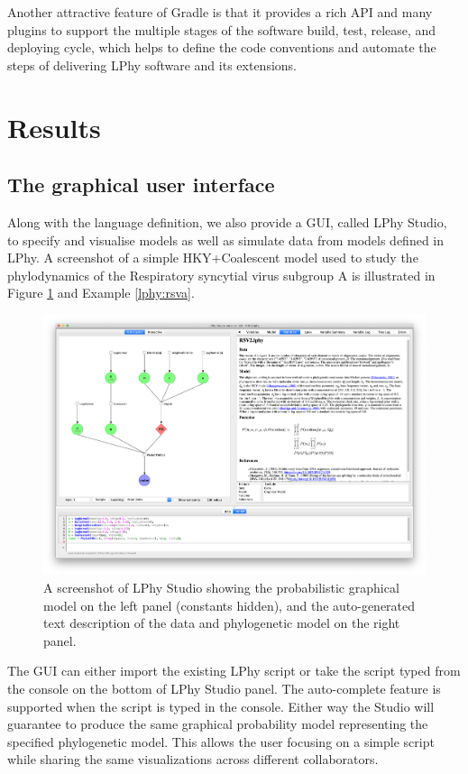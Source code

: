 \documentclass[10pt,letterpaper,table]{article}
\begin{document}
{Another attractive feature of Gradle is that it provides a rich API and many plugins to support the multiple stages of the software build, test, release, and deploying cycle, which helps to define the code conventions and automate the steps of delivering LPhy software and its extensions.  

\section{Results}

\subsection{The graphical user interface}
Along with the language definition, we also provide a GUI, called LPhy Studio, to specify and visualise models as well as simulate data from models defined in LPhy. A screenshot of a simple HKY+Coalescent model used to study the phylodynamics of the Respiratory syncytial virus subgroup A \cite{zlateva2004molecular} is illustrated in Figure \ref{fig:lphystudio} and Example \ref{lphy:rsva}.

\begin{figure}
  \includegraphics[width=\textwidth]{figs/lphystudio_screenshot.png}
  \caption{A screenshot of LPhy Studio showing the probabilistic graphical model 
  on the left panel (constants hidden), and the auto-generated text description of the data and phylogenetic model on the right panel.} 
  \label{fig:lphystudio}
\end{figure}

The GUI can either import the existing LPhy script or take the script typed from the console on the bottom of LPhy Studio panel. 
The auto-complete feature is supported when the script is typed in the console.
Either way the Studio will guarantee to produce the same graphical probability model representing the specified phylogenetic model. 
This allows the user focusing on a simple script while sharing the same visualizations across different collaborators.  

}
\end{document}
